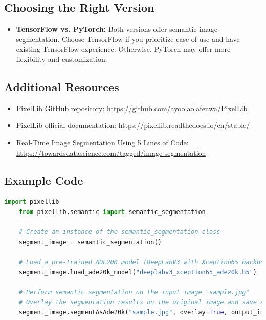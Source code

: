 \subsection*{Choosing the Right Version}

\begin{itemize}[label=--]
    \item \textbf{TensorFlow vs. PyTorch:} Both versions offer semantic image segmentation. Choose TensorFlow if you prioritize ease of use and have existing TensorFlow experience. Otherwise, PyTorch may offer more flexibility and customization.
\end{itemize}

\subsection*{Additional Resources}

\begin{itemize}[label=--]
    \item PixelLib GitHub repository: \url{https://github.com/ayoolaolafenwa/PixelLib}
    \item PixelLib official documentation: \url{https://pixellib.readthedocs.io/en/stable/}
    \item Real-Time Image Segmentation Using 5 Lines of Code: \url{https://towardsdatascience.com/tagged/image-segmentation}
\end{itemize}

\subsection{Example Code}

\begin{lstlisting}[language=Python]
    import pixellib
    from pixellib.semantic import semantic_segmentation
    
    # Create an instance of the semantic_segmentation class
    segment_image = semantic_segmentation()
    
    # Load a pre-trained ADE20K model (DeepLabV3 with Xception65 backbone)
    segment_image.load_ade20k_model("deeplabv3_xception65_ade20k.h5")
    
    # Perform semantic segmentation on the input image "sample.jpg"
    # Overlay the segmentation results on the original image and save as "image_new.jpg"
    segment_image.segmentAsAde20k("sample.jpg", overlay=True, output_image_name="image_new.jpg")
\end{lstlisting}


